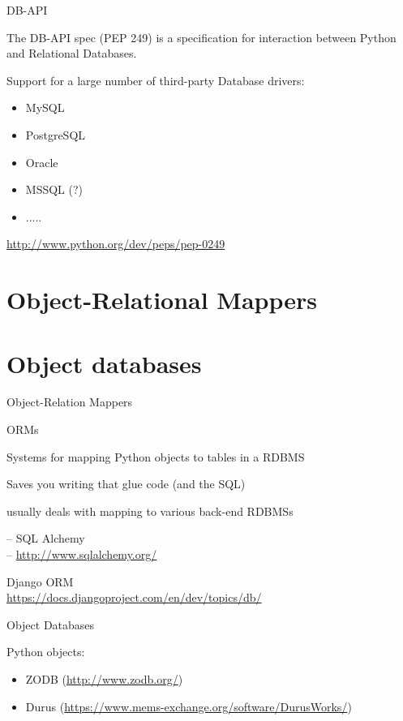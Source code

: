 \documentclass{beamer}
\begin{document}
\begin{frame}[fragile]{DB-API}

\vfill
{\Large The DB-API spec (PEP 249) is a specification for interaction between Python and Relational Databases.}

\vfill
{\Large Support for a large number of third-party Database drivers:
\begin{itemize}
  \item MySQL
  \item PostgreSQL
  \item Oracle
  \item MSSQL (?)
  \item .....
\end{itemize}
}
\vfill
\url{http://www.python.org/dev/peps/pep-0249}
\end{frame} 


\section{Object-Relational Mappers}



\section{Object databases}

\begin{frame}[fragile]{Object-Relation Mappers}

{\LARGE ORMs}

\vfill
{\Large Systems for mapping Python objects to tables in a RDBMS}

\vfill
{\Large Saves you writing that glue code (and the SQL) }

\vfill
{\Large usually deals with mapping to various back-end RDBMSs}

\vfill
{\Large  -- SQL Alchemy}\\ 
 -- \url{http://www.sqlalchemy.org/}

{\Large Django ORM}\\
\url{https://docs.djangoproject.com/en/dev/topics/db/}

\end{frame} 


\begin{frame}[fragile]{Object Databases}

Python objects:
\begin{itemize}
  \item ZODB (\url{http://www.zodb.org/})
  \item Durus (\url{https://www.mems-exchange.org/software/DurusWorks/})
\end{itemize}

\end{frame} 
\end{document}
